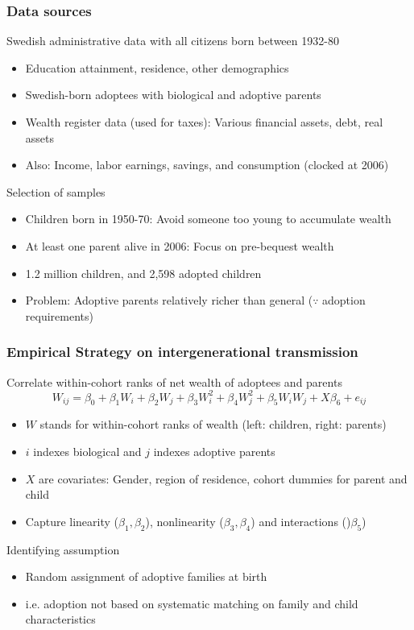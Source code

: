 \documentclass[aspectratio=169]{beamer}
\begin{document}
\begin{frame}
\frametitle{Data sources}
 Swedish administrative data with all citizens born between 1932-80
\begin{itemize}\setlength\itemsep{3pt}
\item Education attainment, residence, other demographics
\item Swedish-born adoptees with biological and adoptive parents
\item Wealth register data (used for taxes): Various financial assets, debt, real assets
\item Also: Income, labor earnings, savings, and consumption (clocked at 2006)
\end{itemize}\medskip
 Selection of samples
\begin{itemize}\setlength\itemsep{3pt}
\item Children born in 1950-70: Avoid someone too young to accumulate wealth
\item At least one parent alive in 2006: Focus on pre-bequest wealth
\item 1.2 million children, and 2,598 adopted children
\item Problem: Adoptive parents relatively richer than general ($\because$ adoption requirements) 
\end{itemize}\medskip
\end{frame}

\begin{frame}
\frametitle{Empirical Strategy on intergenerational transmission}
Correlate within-cohort ranks of net wealth of adoptees and parents
\[
W_{ij}=\beta_0 + \beta_1 W_i + \beta_2 W_j + \beta_3 W_i^2 + \beta_4 W_j^2 + \beta_5 W_i W_j + X\beta_6 + e_{ij}
\]\vspace{-15pt}
\begin{itemize}\setlength\itemsep{3pt}
\item $W$ stands for within-cohort ranks of wealth (left: children, right: parents)
\item $i$ indexes biological and $j$ indexes adoptive parents
\item $X$ are covariates: Gender, region of residence, cohort dummies for parent and child
\item Capture linearity ($\beta_1,\beta_2$), nonlinearity ($\beta_3,\beta_4$) and interactions ()$\beta_5$) 
\end{itemize}\medskip
Identifying assumption
\begin{itemize}\setlength\itemsep{3pt}
\item Random assignment of adoptive families at birth
\item i.e. adoption not based on systematic matching on family and child characteristics
\end{itemize}\medskip
\end{frame}
\end{document}
